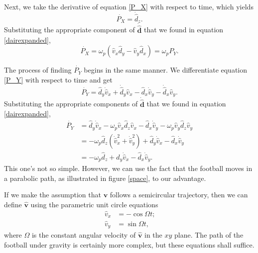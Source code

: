 \documentclass{article}
\begin{document}
Next, we take the derivative of equation \ref{P_X} with respect to time, which yields
\begin{equation}\label{P_X dot 3}
    \dot{P_X} = \dot{\hat{d}}_z\text{.}
\end{equation}
Substituting the appropriate component of $\mathbf{\dot{\hat{d}}}$ that we found in equation \ref{dairexpanded},
\begin{equation}
    \dot{P_X} = \omega_p(\hat{v}_x\hat{d}_y-\hat{v}_y\hat{d}_x) = \omega_pP_Y\text{.}
\end{equation}

The process of finding $\dot{P_Y}$ begins in the same manner. We differentiate equation \ref{P_Y} with respect to time and get
\begin{equation}
    \dot{P_Y} = \hat{d}_y\dot{\hat{v}}_x + \dot{\hat{d}}_y\hat{v}_x - \hat{d}_x\dot{\hat{v}}_y - \dot{\hat{d}}_x\hat{v}_y\text{.}
\end{equation}
Substituting the appropriate components of $\mathbf{\dot{\hat{d}}}$ that we found in equation \ref{dairexpanded},
\begin{equation}\label{P_Y dot}
    \begin{split}
        \dot{P_Y} &= \hat{d}_y\dot{\hat{v}}_x -\omega_p\hat{v}_x\hat{d}_z\hat{v}_x - \hat{d}_x\dot{\hat{v}}_y - \omega_p\hat{v}_y\hat{d}_z\hat{v}_y \\
        &= -\omega_p\hat{d}_z(\dot{\hat{v}}_x^2+\dot{\hat{v}}_y^2) + \hat{d}_y\dot{\hat{v}}_x - \hat{d}_x\dot{\hat{v}}_y \\
        &= -\omega_p\hat{d}_z + \hat{d}_y\dot{\hat{v}}_x - \hat{d}_x\dot{\hat{v}}_y\text{.}
    \end{split}
\end{equation}
This one's not so simple. However, we can use the fact that the football moves in a parabolic path, as illustrated in figure \ref{space}, to our advantage. 

If we make the assumption that $\mathbf{v}$ follows a semicircular trajectory, then we can define $\mathbf{\hat{v}}$ using the parametric unit circle equations
\begin{equation}\label{v model}
    \begin{split}
        \hat{v}_x &= -\cos{\Omega t}\text{;} \\
        \hat{v}_y &= \sin{\Omega t}\text{,}
    \end{split}
\end{equation}
where $\Omega$ is the constant angular velocity of $\mathbf{\hat{v}}$ in the $xy$ plane. The path of the football under gravity is certainly more complex, but these equations shall suffice.
\end{document}
